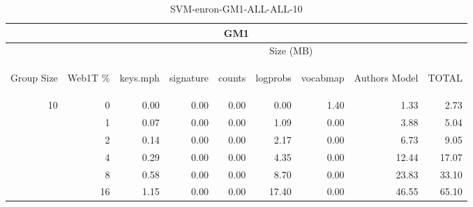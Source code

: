 \begin{center}
\begin{table}[htbp] 
 \begin{center}
\begin{tabular}{ | r | r | r | r | r | r | r | r | r |}
\hline
\multicolumn{9}{|c|}{GM1}\\
\hline
 & & \multicolumn{7}{|c|}{Size (MB)}\\ \cline{3-9}
\begin{sideways}Group Size\end{sideways} & \begin{sideways}Web1T \% \end{sideways} & \begin{sideways}keys.mph\end{sideways} & \begin{sideways}signature\end{sideways} & \begin{sideways}counts\end{sideways} & \begin{sideways}logprobs\end{sideways} & \begin{sideways}vocabmap\end{sideways} & \begin{sideways}Authors Model \end{sideways} & \begin{sideways}TOTAL\end{sideways}\\
\hline
\multirow{5}{*}{10}
 & 0 & 0.00 & 0.00 & 0.00 & 0.00 & 1.40 & 1.33 & 2.73\\ \cline{2-9}
 & 1 & 0.07 & 0.00 & 0.00 & 1.09 & 0.00 & 3.88 & 5.04\\ \cline{2-9}
 & 2 & 0.14 & 0.00 & 0.00 & 2.17 & 0.00 & 6.73 & 9.05\\ \cline{2-9}
 & 4 & 0.29 & 0.00 & 0.00 & 4.35 & 0.00 & 12.44 & 17.07\\ \cline{2-9}
 & 8 & 0.58 & 0.00 & 0.00 & 8.70 & 0.00 & 23.83 & 33.10\\ \cline{2-9}
 & 16 & 1.15 & 0.00 & 0.00 & 17.40 & 0.00 & 46.55 & 65.10\\ \cline{2-9}
\hline
\end{tabular}
\caption{SVM-enron-GM1-ALL-ALL-10}
\label{table:SVM-enron-GM1-ALL-ALL-10}
\end{center}
 \end{table}
\end{center}

